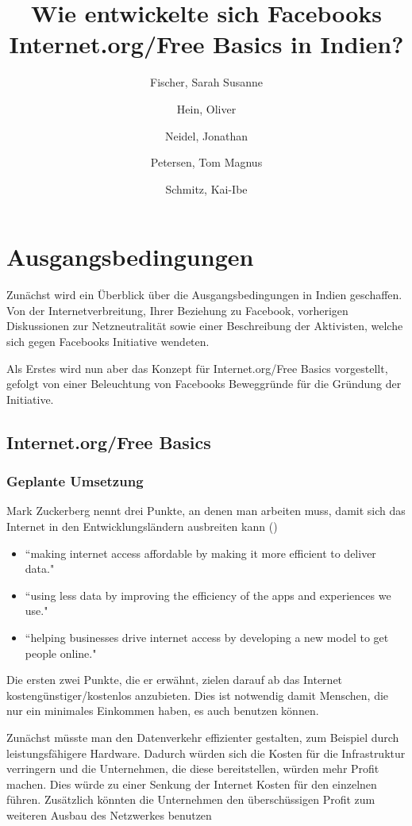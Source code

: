 \documentclass{article}
\title{Wie entwickelte sich Facebooks Internet.org/Free Basics in Indien?}
\author{
  Fischer, Sarah Susanne\\
  \and
  Hein, Oliver\\
  \and
  Neidel, Jonathan\\
  \and
  Petersen, Tom Magnus\\
  \and
  Schmitz, Kai-Ibe\\
}
\begin{document}
\maketitle

\section{Ausgangsbedingungen}

Zunächst wird ein Überblick über die Ausgangsbedingungen in Indien geschaffen. Von der Internetverbreitung, Ihrer Beziehung zu Facebook, vorherigen Diskussionen zur Netzneutralität sowie einer Beschreibung der Aktivisten, welche sich gegen Facebooks Initiative wendeten.

Als Erstes wird nun aber das Konzept für Internet.org/Free Basics vorgestellt, gefolgt von einer Beleuchtung von Facebooks Beweggründe für die Gründung der Initiative.

\subsection{Internet.org/Free Basics}

\subsubsection{Geplante Umsetzung}
        
Mark Zuckerberg nennt drei Punkte, an denen man arbeiten muss, damit sich das Internet in den Entwicklungsländern ausbreiten kann
(\cite{HumanRight})    
\begin{itemize}
\item ``making internet access affordable by making it more efficient to deliver data."

\item ``using less data by improving the efficiency of the apps and experiences we use."

\item ``helping businesses drive internet access by developing a new model to get people online."  
\end{itemize}

Die ersten zwei Punkte, die er erwähnt, zielen darauf ab das Internet kostengünstiger/kostenlos anzubieten. 
Dies ist notwendig damit Menschen, die nur ein minimales Einkommen haben, es auch benutzen können.
\medskip

Zunächst müsste man den Datenverkehr effizienter gestalten, zum Beispiel durch leistungsfähigere Hardware.
Dadurch würden sich die Kosten für die Infrastruktur verringern und die Unternehmen, die diese bereitstellen, würden mehr Profit    
machen. Dies würde zu einer Senkung der Internet Kosten für den einzelnen führen.
Zusätzlich könnten die Unternehmen den überschüssigen Profit zum weiteren Ausbau des Netzwerkes benutzen\\
\end{document}

